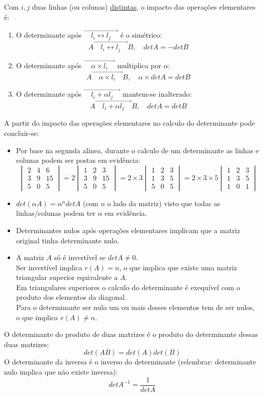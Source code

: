 \documentclass[]{report}
\begin{document}
Com $i,j$ duas linhas (ou colunas) \underline{distintas}, o impacto das operações elementares é:
\begin{enumerate}
\item O determinante após $\overrightarrow{\quad l_i \leftrightarrow l_j \quad}$ é o simétrico:
$$ A {\scriptstyle{\overrightarrow{\quad l_i \leftrightarrow l_j \quad}}} B, \quad det A = - det B$$
\item O determinante após $\overrightarrow{\quad \alpha \times l_i \quad}$ multiplica por $\alpha$:
$$ A {\scriptstyle{\overrightarrow{\quad \alpha \times l_i \quad}}} B, \quad \alpha \times det A = det B$$
\item O determinante após $\overrightarrow{\quad l_i + \alpha l_j \quad}$ mantem-se inalterado:
$$ A {\scriptstyle{\overrightarrow{\quad l_i + \alpha l_j \quad}}} B, \quad  det A = det B$$
\end{enumerate}
A partir do impacto das operações elementares no calculo do determinante pode concluir-se:
\begin{itemize}
\item Por base na segunda alínea, durante o calculo de um determinante as linhas e colunas podem ser postas em evidência:
$$\begin{vmatrix}
2 & 4 & 6 \\
3 & 9 & 15 \\
5 & 0 & 5
\end{vmatrix}
= 2
\begin{vmatrix}
1 & 2 & 3 \\
3 & 9 & 15 \\
5 & 0 & 5
\end{vmatrix}
= 2 \times 3
\begin{vmatrix}
1 & 2 & 3 \\
1 & 3 & 5 \\
5 & 0 & 5
\end{vmatrix}
= 2 \times 3 \times 5
\begin{vmatrix}
1 & 2 & 3 \\
1 & 3 & 5 \\
1 & 0 & 1
\end{vmatrix}
$$
\item $det(\alpha A) = \alpha^n det A$ (com $n$ o lado da matriz) visto que todas as linhas/colunas podem ter $\alpha$ em evidência.
\item Determinantes nulos após operações elementares implicam que a matriz original tinha determinante nulo.
\item A matriz $A$ só é invertível se $det A \neq 0$.\\
Ser invertível implica $r(A) = n$, o que implica que existe uma matriz triangular superior equivalente a $A$.\\
Em triangulares superiores o calculo do determinante é exequível com o produto dos elementos da diagonal.\\
Para o determinante ser nulo um ou mais desses elementos tem de ser nulos, o que implica $r(A) \neq n$.
\end{itemize}
O determinante do produto de duas matrizes é o produto do determinante dessas duas matrizes:
$$det(AB) = det(A)det(B)$$
O determinante da inversa é o inverso do determinante (relembrar: determinante nulo implica que não existe inversa):
$$det A^{-1} = \frac{1}{det A}$$
\end{document}
